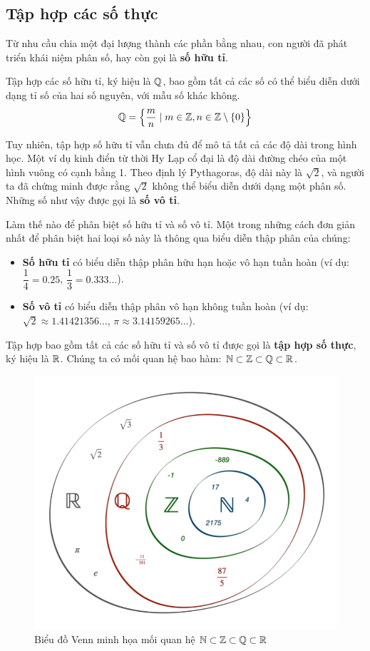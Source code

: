 
\subsection{Tập hợp các số thực}

Từ nhu cầu chia một đại lượng thành các phần bằng nhau, con người đã phát triển khái niệm phân số, hay còn gọi là \textbf{số hữu tỉ}.

\begin{definition}
    Tập hợp các số hữu tỉ, ký hiệu là $\mathbb{Q}$, bao gồm tất cả các số có thể biểu diễn dưới dạng tỉ số của hai số nguyên, với mẫu số khác không.
    \[ \mathbb{Q} = \left\{ \dfrac{m}{n} \mid m \in \mathbb{Z}, n \in \mathbb{Z} \setminus \{0\} \right\} \]
\end{definition}

Tuy nhiên, tập hợp số hữu tỉ vẫn chưa đủ để mô tả tất cả các độ dài trong hình học. Một ví dụ kinh điển từ thời Hy Lạp cổ đại là độ dài đường chéo của một hình vuông có cạnh bằng 1. Theo định lý Pythagoras, độ dài này là $\sqrt{2}$, và người ta đã chứng minh được rằng $\sqrt{2}$ không thể biểu diễn dưới dạng một phân số. Những số như vậy được gọi là \textbf{số vô tỉ}.

Làm thế nào để phân biệt số hữu tỉ và số vô tỉ. Một trong những cách đơn giản nhất để phân biệt hai loại số này là thông qua biểu diễn thập phân của chúng:
\begin{itemize}
    \item \textbf{Số hữu tỉ} có biểu diễn thập phân hữu hạn hoặc vô hạn tuần hoàn (ví dụ: $\dfrac{1}{4} = 0.25$, $\dfrac{1}{3} = 0.333\dots$).
    \item \textbf{Số vô tỉ} có biểu diễn thập phân vô hạn không tuần hoàn (ví dụ: $\sqrt{2} \approx 1.41421356\dots$, $\pi \approx 3.14159265\dots$).
\end{itemize}

\begin{definition}
    Tập hợp bao gồm tất cả các số hữu tỉ và số vô tỉ được gọi là \textbf{tập hợp số thực}, ký hiệu là $\mathbb{R}$. Chúng ta có mối quan hệ bao hàm: $\mathbb{N} \subset \mathbb{Z} \subset \mathbb{Q} \subset \mathbb{R}$.
\end{definition}

\begin{figure}[htbp]
    \centering
    \includegraphics[width=0.5\linewidth]{figures/veen_sets.jpg}
    \caption{Biểu đồ Venn minh họa mối quan hệ $\mathbb{N} \subset \mathbb{Z} \subset \mathbb{Q} \subset \mathbb{R}$}\footnotemark
    \label{fig:venn_sets}
\end{figure}



